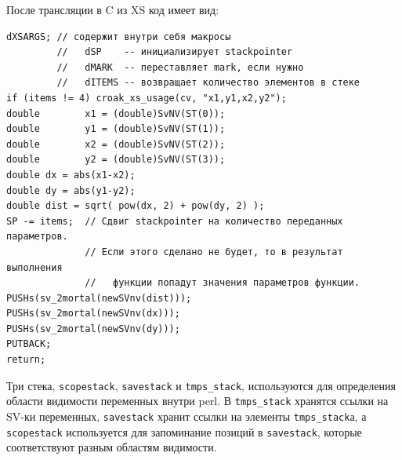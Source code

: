 После трансляции в C из XS код имеет вид:
\begin{verbatim}
dXSARGS; // содержит внутри себя макросы
         //   dSP    -- инициализирует stackpointer
         //   dMARK  -- переставляет mark, если нужно
         //   dITEMS -- возвращает количество элементов в стеке
if (items != 4) croak_xs_usage(cv, "x1,y1,x2,y2");
double        x1 = (double)SvNV(ST(0));
double        y1 = (double)SvNV(ST(1));
double        x2 = (double)SvNV(ST(2));
double        y2 = (double)SvNV(ST(3));
double dx = abs(x1-x2);
double dy = abs(y1-y2);
double dist = sqrt( pow(dx, 2) + pow(dy, 2) );
SP -= items;  // Сдвиг stackpointer на количество переданных параметров.
              // Если этого сделано не будет, то в результат выполнения
              //   функции попадут значения параметров функции.
PUSHs(sv_2mortal(newSVnv(dist)));
PUSHs(sv_2mortal(newSVnv(dx)));
PUSHs(sv_2mortal(newSVnv(dy)));
PUTBACK;
return;
\end{verbatim}
Три стека, \verb|scopestack|,  \verb|savestack| и \verb|tmps_stack|, используются для определения области видимости переменных внутри perl. В \verb|tmps_stack| хранятся ссылки на SV-ки переменных, \verb|savestack| хранит ссылки на элементы \verb|tmps_stack|а, а \verb|scopestack| используется для запоминание позиций в \verb|savestack|, которые соответствуют разным областям видимости.
